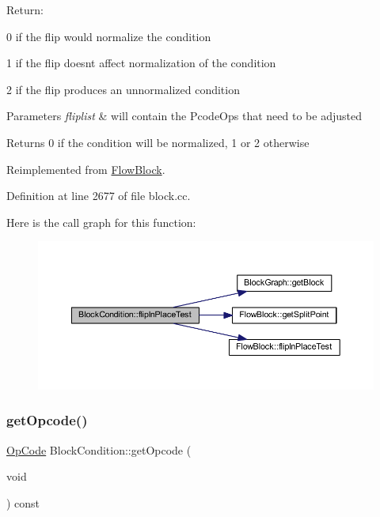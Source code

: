 Return\+:
\begin{DoxyItemize}
\item 0 if the flip would normalize the condition
\item 1 if the flip doesn\textquotesingle{}t affect normalization of the condition
\item 2 if the flip produces an unnormalized condition 
\begin{DoxyParams}{Parameters}
{\em fliplist} & will contain the Pcode\+Ops that need to be adjusted \\
\hline
\end{DoxyParams}
\begin{DoxyReturn}{Returns}
0 if the condition will be normalized, 1 or 2 otherwise 
\end{DoxyReturn}

\end{DoxyItemize}

Reimplemented from \mbox{\hyperlink{class_flow_block_a09019e2e4104844e1a698ccf72560bef}{Flow\+Block}}.



Definition at line 2677 of file block.\+cc.

Here is the call graph for this function\+:
\nopagebreak
\begin{figure}[H]
\begin{center}
\leavevmode
\includegraphics[width=350pt]{class_block_condition_a586d47e72963c4e5f719f3673ef3743c_cgraph}
\end{center}
\end{figure}
\mbox{\label{class_block_condition_a5dbdfcf9564708d69c63089919486db1}} 
\subsubsection{\texorpdfstring{getOpcode()}{getOpcode()}}
{\footnotesize\ttfamily \mbox{\hyperlink{opcodes_8hh_abeb7dfb0e9e2b3114e240a405d046ea7}{Op\+Code}} Block\+Condition\+::get\+Opcode (\begin{DoxyParamCaption}\item[{void}]{ }\end{DoxyParamCaption}) const\hspace{0.3cm}{\ttfamily [inline]}}



